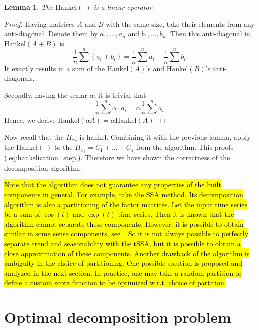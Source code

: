 \documentclass[referee, pdflatex, sn-mathphys-num]{sn-jnl}
\theoremstyle{definition}
\theoremstyle{plain}
\newtheorem{Lem}{Lemma}
\begin{document}
	\begin{Lem}
		The $ \text{Hankel}(\cdot) $ is a linear operator.
	\end{Lem}
	
	\begin{proof}		
		Having matrices $ A $ and $ B $ with the same size, take their elements from any anti-diagonal. Denote them by $ a_1, \ldots, a_n $ and $ b_1, \ldots, b_n $. Then this anti-diagonal in $ \text{Hankel}(A + B) $ is \begin{equation*}
			 \dfrac{1}{n} \sum\limits^n (a_i + b_i) = \dfrac{1}{n} \sum\limits^n a_i + \dfrac{1}{n} \sum\limits^n b_i.
		\end{equation*}	It exactly results in a sum of the $ \text{Hankel}(A) $'s and $ \text{Hankel}(B) $'s anti-diagonals.
		
		Secondly, having the scalar $ \alpha $, it is trivial that \begin{equation*}
			 \dfrac{1}{n} \sum\limits^n \alpha \cdot a_i = \alpha \dfrac{1}{n} \sum\limits^n a_i.
		\end{equation*}	Hence, we derive $ \text{Hankel}(\alpha A) = \alpha \text{Hankel}(A) $.
	\end{proof}
	
	Now recall that the $ H_{x_k} $ is hankel. Combining it with the previous lemma, apply the $ \text{Hankel}(\cdot) $ to the $ H_{x_k} = C_1 + \ldots + C_s $ from the algorithm. This proofs (\ref{eq:hankelization_step}). Therefore we have shown the correctness of the decomposition algorithm.
	
	\hl{Note that the algorithm does not guarantee any properties of the built components in general. For example, take the SSA method. Its decomposition algorithm is also a partitioning of the factor matrices. Let the input time series be a sum of $\cos(t)$ and $\exp (t)$ time series. Then it is known that the algorithm cannot separate these components. However, it is possible to obtain similar in some sense components, see~{\cite{ecfb9dc578be43ae9ee8fc88b8ff9151}}. So it is not always possible to perfectly separate trend and seasonability with the tSSA, but it is possible to obtain a close approximation of these components. Another drawback of the algorithm is ambiguity in the choice of partitioning. One possible solution is proposed and analyzed in the next section. In practice, one may take a random partition or define a custom score function to be optimized w.r.t. choice of partition.}
	
	\section{Optimal decomposition problem}\label{sec:optimal_decomp}
	
\end{document}
